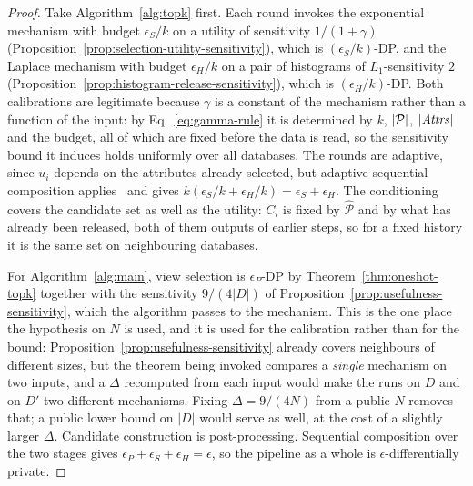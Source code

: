 \begin{proof}
Take Algorithm~\ref{alg:topk} first.
Each round invokes the exponential mechanism with budget $\epsilon_S/k$ on a utility of sensitivity $1/(1+\gamma)$ (Proposition~\ref{prop:selection-utility-sensitivity}), which is $(\epsilon_S/k)$-DP, and the Laplace mechanism with budget $\epsilon_H/k$ on a pair of histograms of $L_1$-sensitivity $2$ (Proposition~\ref{prop:histogram-release-sensitivity}), which is $(\epsilon_H/k)$-DP.
Both calibrations are legitimate because $\gamma$ is a constant of the mechanism rather than a function of the input: by Eq.~\eqref{eq:gamma-rule} it is determined by $k$, $|\mathcal{P}|$, $|\mathit{Attrs}|$ and the budget, all of which are fixed before the data is read, so the sensitivity bound it induces holds uniformly over all databases.
The rounds are adaptive, since $u_i$ depends on the attributes already selected, but adaptive sequential composition applies~\cite{DBLP:series/synthesis/2016Li} and gives $k(\epsilon_S/k+\epsilon_H/k)=\epsilon_S+\epsilon_H$.
The conditioning covers the candidate set as well as the utility: $C_i$ is fixed by $\widehat{\mathcal{P}}$ and by what has already been released, both of them outputs of earlier steps, so for a fixed history it is the same set on neighbouring databases.

For Algorithm~\ref{alg:main}, view selection is $\epsilon_P$-DP by Theorem~\ref{thm:oneshot-topk} together with the sensitivity $9/(4|D|)$ of Proposition~\ref{prop:usefulness-sensitivity}, which the algorithm passes to the mechanism.
This is the one place the hypothesis on $N$ is used, and it is used for the calibration rather than for the bound: Proposition~\ref{prop:usefulness-sensitivity} already covers neighbours of different sizes, but the theorem being invoked compares a \emph{single} mechanism on two inputs, and a $\Delta$ recomputed from each input would make the runs on $D$ and on $D'$ two different mechanisms.
Fixing $\Delta=9/(4N)$ from a public $N$ removes that; a public lower bound on $|D|$ would serve as well, at the cost of a slightly larger $\Delta$.
Candidate construction is post-processing.
Sequential composition over the two stages gives $\epsilon_P+\epsilon_S+\epsilon_H=\epsilon$, so the pipeline as a whole is $\epsilon$-differentially private.
\end{proof}


